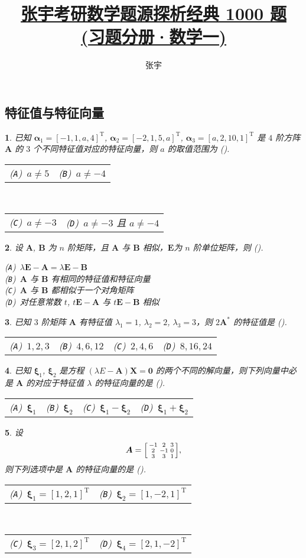 \documentclass[openany,twocolumn]{ctexbook}
\title{\href{https://github.com/sikouhjw/zhangyu1000}{张宇考研数学题源探析经典 1000 题\\(习题分册·数学一)}}
\author{张宇}
\makeatletter
\numberwithin{figure}{section}
\theoremstyle{change}
\theoremstyle{change}
\newtheorem{titwo}{}
\def\kuo{ \mbox{(\hspace{1pc})}}
\newcommand{\fourch}[4]{\noindent\begin{tabular}{*{4}{@{}p{1.97cm}}}(\texttt{A})~#1 & (\texttt{B})~#2 & (\texttt{C})~#3 & (\texttt{D})~#4\end{tabular}} %
\newcommand{\twoch}[4]{\noindent\begin{tabular}{*{2}{@{}p{3.94cm}}}(\texttt{A})~#1 & (\texttt{B})~#2\end{tabular}\\\begin{tabular}{*{2}{@{}p{3.94cm}}}(\texttt{C})~#3 & (\texttt{D})~#4\end{tabular}}  %
\newcommand{\onech}[4]{\noindent(\texttt{A})~#1 \\ (\texttt{B})~#2 \\ (\texttt{C})~#3 \\ (\texttt{D})~#4}  %
\def\TT{\mathrm{T}}
\def\astt{*}
\makeatother
\begin{document}
	
	\subsection{特征值与特征向量}
	\begin{titwo}
		已知 $\bm \alpha_{1} = [-1,1,a,4]^{\TT}$, $\bm \alpha_{2} = [-2,1,5,a]^{\TT}$, $\bm \alpha_{3} = [a,2,10,1]^{\TT}$ 是 $4$ 阶方阵 $\bm A$ 的 $3$ 个不同特征值对应的特征向量，则 $a$ 的取值范围为 \kuo.

		\twoch{$a \ne 5$}{$a \ne -4$}{$a \ne -3$}{$a \ne -3$ 且 $a \ne -4$}
	\end{titwo}

	\begin{titwo}
		设 $\bm A$, $\bm B$ 为 $n$ 阶矩阵，且 $\bm A$ 与 $\bm B$ 相似，$\bm E$为 $n$ 阶单位矩阵，则 \kuo.

		\onech{$\lambda \bm E - \bm A = \lambda \bm E - \bm B$}{$\bm A$ 与 $\bm B$ 有相同的特征值和特征向量}{$\bm A$ 与 $\bm B$ 都相似于一个对角矩阵}{对任意常数 $t$, $t \bm E - \bm A$ 与 $t \bm E - \bm B$ 相似}
	\end{titwo}

	\begin{titwo}
		已知 $3$ 阶矩阵 $\bm A$ 有特征值 $\lambda_{1} = 1$, $\lambda_{2} = 2$, $\lambda_{3} = 3$，则 $2 \bm A^{\astt}$ 的特征值是 \kuo.

		\fourch{$1,2,3$}{$4,6,12$}{$2,4,6$}{$8,16,24$}
	\end{titwo}

	\begin{titwo}
		已知 $\bm \xi_{1}$, $\bm \xi_{2}$ 是方程 $(\lambda E - \bm A) \bm X = \bm 0$ 的两个不同的解向量，则下列向量中必是 $\bm A$ 的对应于特征值 $\lambda$ 的特征向量的是 \kuo.

		\fourch{$\bm \xi_{1}$}{$\bm \xi_{2}$}{$\bm \xi_{1} - \bm \xi_{2}$}{$\bm \xi_{1} + \bm \xi_{2}$}
	\end{titwo}

	\begin{titwo}
		设
		\[
			\bm A = \begin{bsmallmatrix}
				-1 & 2 & 3 \\
				2 & -1 & 0 \\
				3 & 3 & 1
			\end{bsmallmatrix},
		\]
		则下列选项中是 $\bm A$ 的特征向量的是 \kuo.

		\twoch{$\bm \xi_{1} = [1,2,1]^{\TT}$}{$\bm \xi_{2} = [1,-2,1]^{\TT}$}{$\bm \xi_{3} = [2,1,2]^{\TT}$}{$\bm \xi_{4} = [2,1,-2]^{\TT}$}
	\end{titwo}
\end{document}
